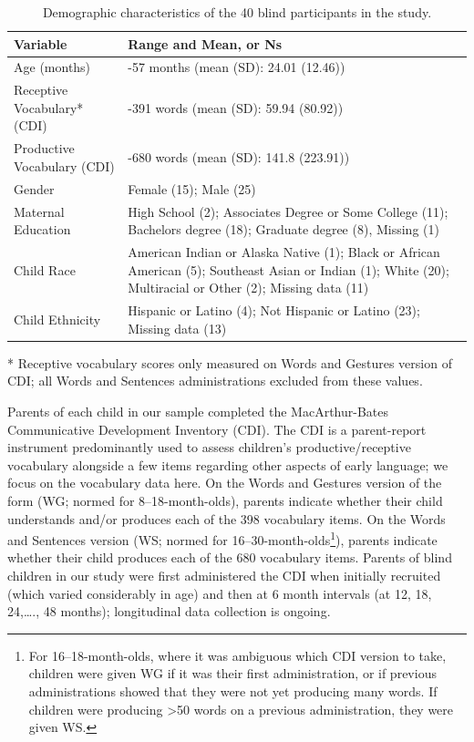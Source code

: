 \documentclass[
  man,floatsintext]{apa6}
\begin{document}
\begin{table}[H]

\begin{threeparttable}
\caption{\label{tab:demographics-table}Demographic characteristics of the 40 blind participants in the study.}
\centering
\begin{tabular}[t]{l|>{\raggedright\arraybackslash}p{4in}}
\hline
Variable & Range and Mean, or Ns\\
\hline
Age (months) & 7-57 months (mean (SD): 24.01 (12.46))\\
\hline
Receptive Vocabulary* (CDI) & 0-391 words (mean (SD): 59.94 (80.92))\\
\hline
Productive Vocabulary (CDI) & 0-680 words (mean (SD): 141.8 (223.91))\\
\hline
Gender & Female (15); Male (25)\\
\hline
Maternal Education & High School (2); Associates Degree or Some College (11); Bachelors degree (18); Graduate degree (8), Missing (1)\\
\hline
Child Race & American Indian or Alaska Native (1); Black or African American (5); Southeast Asian or Indian (1); White (20); Multiracial or Other (2); Missing data (11)\\
\hline
Child Ethnicity & Hispanic or Latino (4); Not Hispanic or Latino (23); Missing data (13)\\
\hline
\end{tabular}
\begin{tablenotes}
\small
\item [*] Receptive vocabulary scores only measured on Words and Gestures version of CDI; all Words and Sentences administrations excluded from these values.
\end{tablenotes}
\end{threeparttable}
\end{table}

Parents of each child in our sample completed the MacArthur-Bates Communicative Development Inventory (CDI). The CDI is a parent-report instrument predominantly used to assess children's productive/receptive vocabulary alongside a few items regarding other aspects of early language; we focus on the vocabulary data here. On the Words and Gestures version of the form (WG; normed for 8--18-month-olds), parents indicate whether their child understands and/or produces each of the 398 vocabulary items. On the Words and Sentences version (WS; normed for 16--30-month-olds\footnote{For 16--18-month-olds, where it was ambiguous which CDI version to take, children were given WG if it was their first administration, or if previous administrations showed that they were not yet producing many words. If children were producing \textgreater50 words on a previous administration, they were given WS.}), parents indicate whether their child produces each of the 680 vocabulary items. Parents of blind children in our study were first administered the CDI when initially recruited (which varied considerably in age) and then at 6 month intervals (at 12, 18, 24,\ldots., 48 months); longitudinal data collection is ongoing.
\end{document}
